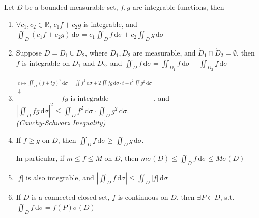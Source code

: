 \begin{theorem}
    Let $D$ be a bounded measurable set, $f,g$ are integrable functions, then
    \begin{enumerate}
        \item $\forall c_1,c_2\in\mathbb{R}$, $c_1f+c_2g$ is integrable, and $\iint_D(c_1f+c_2g)\,\mathrm{d}\sigma=c_1\iint_Df\,\mathrm{d}\sigma+c_2\iint_Dg\,\mathrm{d}\sigma$
        \item Suppose $D=D_1\cup D_2$, where $D_1,D_2$ are measurable, and $\mathring{D}_1\cap\mathring{D}_2=\emptyset$, then $f$ is integrable on $D_1$ and $D_2$, and $\iint_Df\,\mathrm{d}\sigma=\iint_{D_1}f\,\mathrm{d}\sigma+\iint_{D_2}f\,\mathrm{d}\sigma$
        \item $\overset{\substack{t\mapsto\iint_D(f+tg)^2\,\mathrm{d}\sigma=\iint f^2\,\mathrm{d}\sigma+2\iint fg\,\mathrm{d}\sigma\cdot t+t^2\iint g^2\,\mathrm{d}\sigma\\\downarrow}}{fg\text{ is integrable}}$, and $\left|\iint_Dfg\,\mathrm{d}\sigma\right|^2\leq\iint_Df^2\,\mathrm{d}\sigma\cdot\iint_Dg^2\,\mathrm{d}\sigma$.\\
              \emph{(Cauchy-Schwarz Inequality)}
        \item If $f\geq g$ on $D$, then $\iint_Df\,\mathrm{d}\sigma\geq\iint_Dg\,\mathrm{d}\sigma$.

              In particular, if $m\leq f\leq M$ on $D$, then $m\sigma(D)\leq\iint_Df\,\mathrm{d}\sigma\leq M\sigma(D)$
        \item $|f|$ is also integrable, and $\left|\iint_Df\,\mathrm{d}\sigma\right|\leq\iint_D|f|\,\mathrm{d}\sigma$
        \item If $D$ is a connected closed set, $f$ is continuous on $D$, then $\exists P\in D$, s.t.\\
              $\iint_Df\,\mathrm{d}\sigma=f(P)\sigma(D)$
    \end{enumerate}
\end{theorem}

